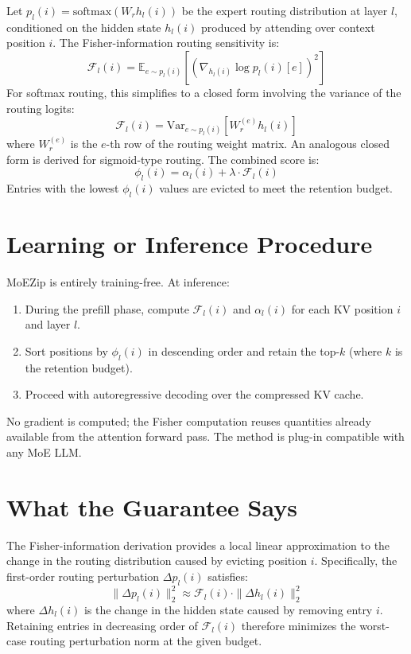 \documentclass[10pt,twocolumn]{article}
\begin{document}
Let $p_l(i) = \text{softmax}(W_r h_l(i))$ be the expert routing distribution at
layer $l$, conditioned on the hidden state $h_l(i)$ produced by attending over
context position $i$. The Fisher-information routing sensitivity is:
\[
\mathcal{F}_l(i) = \mathbb{E}_{e \sim p_l(i)}\!\left[\left(\nabla_{h_l(i)} \log p_l(i)[e]\right)^2\right]
\]
For softmax routing, this simplifies to a closed form involving the variance of
the routing logits:
\[
\mathcal{F}_l(i) = \text{Var}_{e \sim p_l(i)}\!\left[W_r^{(e)} h_l(i)\right]
\]
where $W_r^{(e)}$ is the $e$-th row of the routing weight matrix. An analogous
closed form is derived for sigmoid-type routing. The combined score is:
\[
\phi_l(i) = \alpha_l(i) + \lambda \cdot \mathcal{F}_l(i)
\]
Entries with the lowest $\phi_l(i)$ values are evicted to meet the
retention budget.

\section{Learning or Inference Procedure}

MoEZip is entirely training-free. At inference:

\begin{enumerate}[itemsep=2pt,parsep=0pt]
  \item During the prefill phase, compute $\mathcal{F}_l(i)$ and
    $\alpha_l(i)$ for each KV position $i$ and layer $l$.
  \item Sort positions by $\phi_l(i)$ in descending order and retain the
    top-$k$ (where $k$ is the retention budget).
  \item Proceed with autoregressive decoding over the compressed KV cache.
\end{enumerate}

No gradient is computed; the Fisher computation reuses quantities already
available from the attention forward pass. The method is plug-in compatible
with any MoE LLM.

\section{What the Guarantee Says}

The Fisher-information derivation provides a local linear approximation to the
change in the routing distribution caused by evicting position $i$. Specifically,
the first-order routing perturbation $\Delta p_l(i)$ satisfies:
\[
\|\Delta p_l(i)\|_2^2 \approx \mathcal{F}_l(i) \cdot \|\Delta h_l(i)\|_2^2
\]
where $\Delta h_l(i)$ is the change in the hidden state caused by removing
entry $i$. Retaining entries in decreasing order of $\mathcal{F}_l(i)$ therefore
minimizes the worst-case routing perturbation norm at the given budget.
\end{document}
